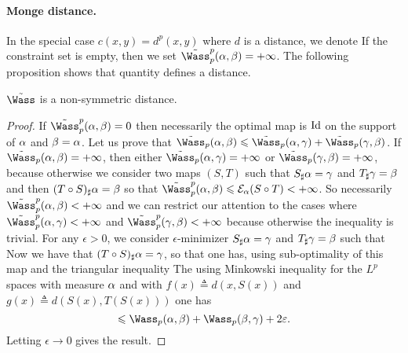 \paragraph{Monge distance.}

In the special case $c(x,y)=d^p(x,y)$ where $d$ is a distance, we denote 
If the constraint set is empty, then we set $\tilde \Wass_p^p(\al,\be) = +\infty$.
%
The following proposition shows that quantity defines a distance.

\begin{prop}
	$\tilde \Wass$ is a non-symmetric distance.
\end{prop}
\begin{proof}
	If $\tilde \Wass_p^p(\al,\be)=0$ then necessarily the optimal map is $\mathrm{Id}$ on the support of $\alpha$ and $\beta=\alpha$.
	Let us prove that $\tilde \Wass_p(\al,\be) \leq \tilde \Wass_p(\al,\ga)+\tilde \Wass_p(\ga,\be)$.
	If $\tilde \Wass_p(\al,\be)=+\infty$, then either $\tilde \Wass_p(\al,\ga)=+\infty$ or $\tilde \Wass_p(\ga,\be)=+\infty$, because otherwise we consider two maps $(S,T)$ such that $S_\sharp \alpha=\gamma$ and $T_\sharp \gamma=\beta$ and then $(T \circ S)_\sharp \alpha = \beta$ so that 
	$\tilde \Wass_p^p(\al,\be) \leq \Ee_\al(S \circ T) < +\infty$.
	So necessarily $\tilde \Wass_p^p(\al,\be)<+\infty$ and we can restrict our attention to the cases 
	where $\tilde \Wass_p^p(\al,\ga)<+\infty$ and $\tilde \Wass_p^p(\ga,\be)<+\infty$ because otherwise the inequality is trivial.
	For any $\epsilon>0$, we consider $\epsilon$-minimizer $S_\sharp \alpha=\gamma$ and $T_\sharp \gamma=\beta$ such that
	Now we have that $(T \circ S)_\sharp \alpha=\gamma$, so that 
	one has, using sub-optimality of this map and the triangular inequality 
	The using Minkowski inequality for the $L^p$ spaces with measure $\alpha$ 
	and with $f(x) \triangleq d(x,S(x))$ and $g(x) \triangleq d(S(x),T(S(x)))$
	one has
	$$
		\leq \Wass_p(\al,\be) + \Wass_p(\be,\ga) + 2 \epsilon.
	$$
	Letting $\epsilon \rightarrow 0$ gives the result. 
\end{proof}

